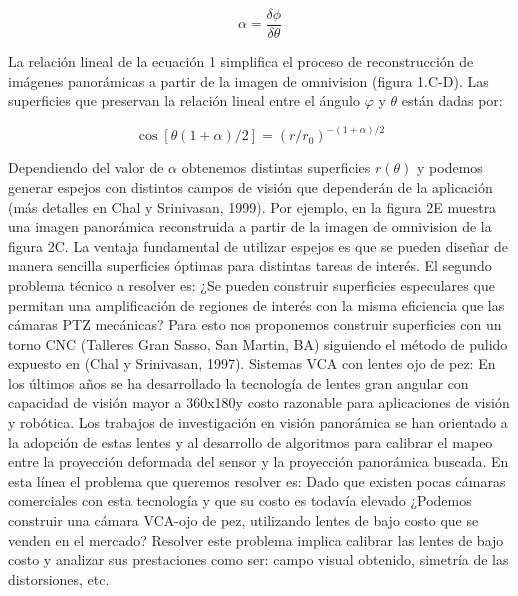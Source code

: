 \documentclass[12pt,a4paper]{article}
\begin{document}
\begin{equation}
    \alpha = \frac{\delta\phi}{\delta\theta}
\end{equation}

La relación lineal de la ecuación 1 simplifica el proceso de reconstrucción de imágenes panorámicas a partir de la imagen de omnivision (figura 1.C-D).  Las superficies que preservan la relación lineal entre el ángulo $\varphi$ y $\theta$ están dadas por:

\begin{equation}
    \cos \left[ \theta \left( 1 + \alpha \right) / 2 \right] = 
    \left( r / r_{0} \right)^{-\left( 1 + \alpha \right) / 2}
\end{equation}

Dependiendo del valor de $\alpha$ obtenemos distintas superficies $r(\theta)$ y podemos generar espejos con distintos campos de visión que dependerán de la aplicación (más detalles en Chal y Srinivasan, 1999). Por ejemplo, en la figura 2E muestra una imagen panorámica reconstruida a partir de la imagen de omnivision de la figura 2C. La ventaja fundamental de utilizar espejos es que se pueden diseñar de manera sencilla superficies óptimas para distintas tareas de interés.
El segundo problema técnico a resolver es:  ¿Se pueden construir superficies especulares que permitan una amplificación de regiones de interés con la misma eficiencia que las cámaras PTZ mecánicas?
Para esto nos proponemos construir superficies con un torno CNC (Talleres Gran Sasso, San Martin, BA) siguiendo el método de pulido expuesto en (Chal y Srinivasan, 1997).
 Sistemas VCA con lentes ojo de pez: En los últimos años se ha desarrollado la tecnología de lentes gran angular con capacidad de visión mayor a 360\degree x180\degree y costo razonable para aplicaciones de visión y robótica. Los trabajos de investigación en visión panorámica se han orientado a la adopción de estas lentes y al desarrollo de algoritmos para calibrar el mapeo entre la proyección deformada del sensor y la proyección panorámica buscada. 
En esta línea el problema que queremos resolver es: Dado que existen pocas cámaras comerciales con esta tecnología y que su costo es todavía elevado ¿Podemos construir una cámara VCA-ojo de pez, utilizando lentes de bajo costo que se venden en el mercado?
Resolver este problema implica calibrar las lentes de bajo costo y analizar sus prestaciones como ser: campo visual obtenido, simetría de las distorsiones, etc.
\end{document}
